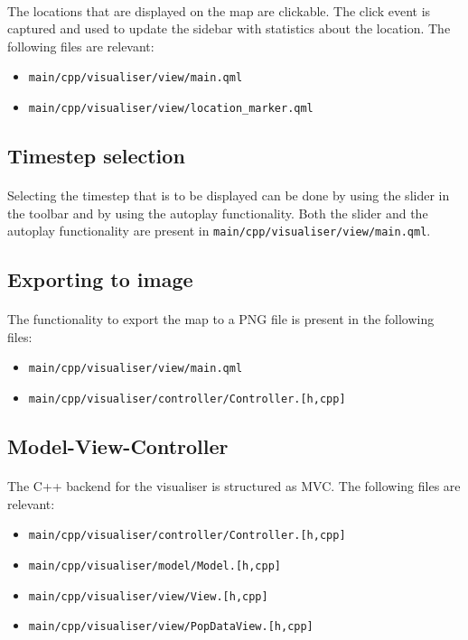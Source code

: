 \documentclass{article}
\begin{document}
\paragraph{} The locations that are displayed on the map are clickable. The click event is captured and used to update the sidebar with statistics about the location. The following files are relevant:
\begin{itemize}
\item \texttt{main/cpp/visualiser/view/main.qml}
\item \texttt{main/cpp/visualiser/view/location\_marker.qml}
\end{itemize}

\subsection{Timestep selection}

\paragraph{} Selecting the timestep that is to be displayed can be done by using the slider in the toolbar and by using the autoplay functionality. Both the slider and the autoplay functionality are present in \texttt{main/cpp/visualiser/view/main.qml}.

\subsection{Exporting to image}

\paragraph{} The functionality to export the map to a PNG file is present in the following files:
\begin{itemize}
\item \texttt{main/cpp/visualiser/view/main.qml}
\item \texttt{main/cpp/visualiser/controller/Controller.[h,cpp]}
\end{itemize}

\subsection{Model-View-Controller}

\paragraph{} The C++ backend for the visualiser is structured as MVC. The following files are relevant:
\begin{itemize}
\item \texttt{main/cpp/visualiser/controller/Controller.[h,cpp]}
\item \texttt{main/cpp/visualiser/model/Model.[h,cpp]}
\item \texttt{main/cpp/visualiser/view/View.[h,cpp]}
\item \texttt{main/cpp/visualiser/view/PopDataView.[h,cpp]}
\end{itemize}
\end{document}

